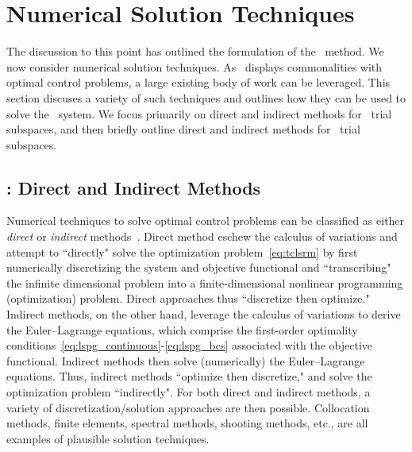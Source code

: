 \section{Numerical Solution Techniques}\label{sec:numerical_techniques}
The discussion to this point has outlined the formulation of the \methodAcronym\ method. We now consider numerical solution techniques. 
As \methodAcronym\ displays commonalities with optimal control problems, a large existing body of work can be leveraged. This section discuses a variety of such techniques and outlines how they can be used to solve the \methodAcronym\ system. We focus primarily on direct and indirect methods for \spatialAcronym\ trial subspaces, 
and then briefly outline direct and indirect methods for \spaceTimeAcronym\ trial subspaces. 

\subsection{\spatialAcronym: Direct and Indirect Methods}
Numerical techniques to
solve optimal control problems can be classified as either
\textit{direct} or \textit{indirect}
methods~\cite{conway_optimalcontrolreview}. Direct method eschew the calculus of variations 
and attempt to ``directly" solve the optimization problem~\eqref{eq:tclsrm} by first
numerically discretizing the system and objective functional and ``transcribing"
the infinite dimensional problem into a finite-dimensional nonlinear
programming (optimization) problem. Direct approaches thus ``discretize then optimize."
Indirect methods, on the other hand, leverage the calculus of variations to
derive the Euler--Lagrange equations, which comprise the first-order optimality conditions~\eqref{eq:lspg_continuous}-\eqref{eq:lspg_bcs} associated with the objective 
functional. Indirect methods then solve (numerically) the Euler--Lagrange equations. Thus, indirect methods ``optimize then discretize," and 
solve the optimization problem
``indirectly". For both direct and indirect methods, a variety of
discretization/solution approaches are then possible. Collocation methods,
finite elements, spectral methods, shooting methods, etc., are all examples of
plausible solution techniques.  

